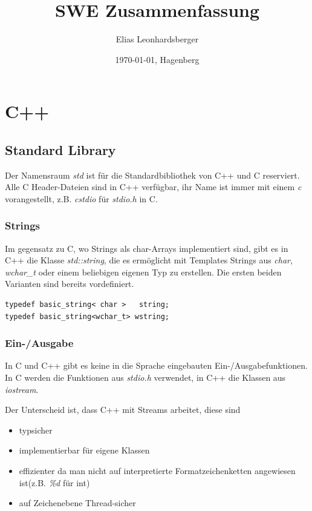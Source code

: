 \documentclass[12pt]{scrartcl}
\title{SWE Zusammenfassung}
\author{Elias Leonhardsberger}
\date{\today{}, Hagenberg}
\begin{document}
\maketitle
\tableofcontents

\pagebreak

\section{C++}
\subsection{Standard Library}
Der Namensraum \emph{std} ist für die Standardbibliothek von C++ und C reserviert.
Alle C Header-Dateien sind in C++ verfügbar, ihr Name ist immer mit einem \emph{c}
vorangestellt, z.B. \emph{cstdio} für \emph{stdio.h} in C.

\subsubsection{Strings}
Im gegensatz zu C, wo Strings als char-Arrays implementiert sind, gibt es in C++
die Klasse \emph{std::string}, die es ermöglicht mit Templates Strings aus \emph{char},
\emph{wchar\_t} oder einem beliebigen eigenen Typ zu erstellen. Die ersten beiden
Varianten sind bereits vordefiniert.

\begin{verbatim}
typedef basic_string< char >   string;
typedef basic_string<wchar_t> wstring;
\end{verbatim}

\subsubsection{Ein-/Ausgabe}
In C und C++ gibt es keine in die Sprache eingebauten Ein-/Ausgabefunktionen. In C werden
die Funktionen aus \emph{stdio.h} verwendet, in C++ die Klassen aus \emph{iostream}.

Der Unterscheid ist, dass C++ mit Streams arbeitet, diese sind
\begin{itemize}
	\item typsicher
	\item implementierbar für eigene Klassen
	\item effizienter da man nicht auf interpretierte Formatzeichenketten angewiesen ist(z.B. \emph{\%d} für int)
	\item auf Zeichenebene Thread-sicher
\end{itemize}
\end{document}

